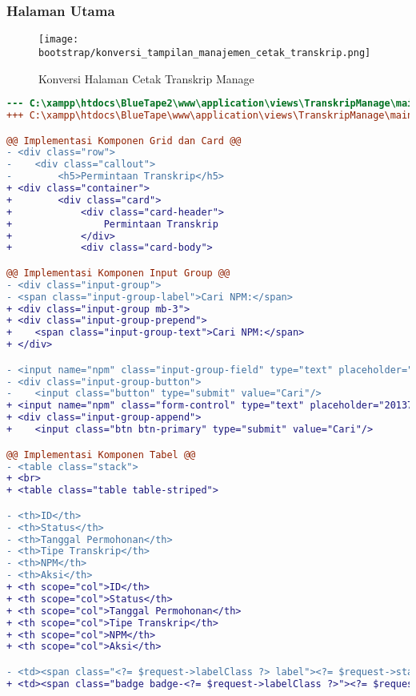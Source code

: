 \subsubsection{Halaman Utama}
\begin{figure} [H]
	\centering  
	\texttt{[image: bootstrap/konversi\_tampilan\_manajemen\_cetak\_transkrip.png]}  
	\caption{Konversi Halaman Cetak Transkrip Manage} 
\end{figure}
\begin{lstlisting}[language=diff, caption=Kode untuk Halaman Cetak Transkrip Manage, label=Entri, basicstyle=\ttfamily, frame=single,
columns=fullflexible, keepspaces=true, breaklines=true]
--- C:\xampp\htdocs\BlueTape2\www\application\views\TranskripManage\main.php
+++ C:\xampp\htdocs\BlueTape\www\application\views\TranskripManage\main.php

@@ Implementasi Komponen Grid dan Card @@
- <div class="row">
-    <div class="callout">
-        <h5>Permintaan Transkrip</h5>
+ <div class="container">
+        <div class="card">
+            <div class="card-header">
+                Permintaan Transkrip
+            </div>
+            <div class="card-body">

@@ Implementasi Komponen Input Group @@ 
- <div class="input-group">
- <span class="input-group-label">Cari NPM:</span>
+ <div class="input-group mb-3">
+ <div class="input-group-prepend">
+    <span class="input-group-text">Cari NPM:</span>
+ </div>

- <input name="npm" class="input-group-field" type="text" placeholder="2013730013" maxlength="10" minlength="10"<?= $npmQuery === NULL ? '' : " value='$npmQuery'" ?>/>
- <div class="input-group-button">
-    <input class="button" type="submit" value="Cari"/>
+ <input name="npm" class="form-control" type="text" placeholder="2013730013" maxlength="10" minlength="10"<?= $npmQuery === NULL ? '' : " value='$npmQuery'" ?>/>
+ <div class="input-group-append">
+    <input class="btn btn-primary" type="submit" value="Cari"/>

@@ Implementasi Komponen Tabel @@ 
- <table class="stack">
+ <br>
+ <table class="table table-striped">

- <th>ID</th>
- <th>Status</th>
- <th>Tanggal Permohonan</th>
- <th>Tipe Transkrip</th>
- <th>NPM</th>
- <th>Aksi</th>
+ <th scope="col">ID</th>
+ <th scope="col">Status</th>
+ <th scope="col">Tanggal Permohonan</th>
+ <th scope="col">Tipe Transkrip</th>
+ <th scope="col">NPM</th>
+ <th scope="col">Aksi</th>

- <td><span class="<?= $request->labelClass ?> label"><?= $request->status ?></span></td>
+ <td><span class="badge badge-<?= $request->labelClass ?>"><?= $request->status ?></span></td>
\end{lstlisting}

